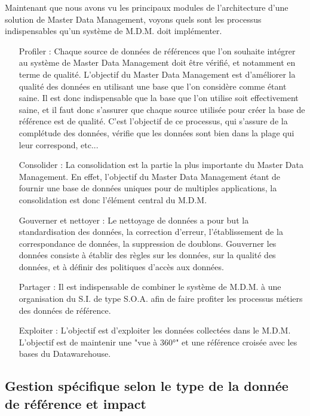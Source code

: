 Maintenant que nous avons vu les principaux modules de l'architecture d'une solution de Master Data Management, voyons quels sont les processus indispensables qu'un système de M.D.M. doit implémenter.

\begin{itemize}

\item[Profiler : ]
Chaque source de données de références que l'on souhaite intégrer au système de Master Data Management doit être vérifié, et notamment en terme de qualité. L'objectif du Master Data Management est d'améliorer la qualité des données en utilisant une base que l'on considère comme étant saine. Il est donc indispensable que la base que l'on utilise soit effectivement saine, et il faut donc s'assurer que chaque source utilisée pour créer la base de référence est de qualité. C'est l'objectif de ce processus, qui s'assure de la complétude des données, vérifie que les données sont bien dans la plage qui leur correspond, etc...

\item[Consolider : ]
La consolidation est la partie la plus importante du Master Data Management. En effet, l'objectif du Master Data Management étant de fournir une base de données uniques pour de multiples applications, la consolidation est donc l'élément central du M.D.M.

\item[Gouverner et nettoyer : ]
Le nettoyage de données a pour but la standardisation des données, la correction d'erreur, l'établissement de la correspondance de données, la suppression de doublons. Gouverner les données consiste à établir des règles sur les données, sur la qualité des données, et à définir des politiques d'accès aux données.

\item[Partager : ]
Il est indispensable de combiner le système de M.D.M. à une organisation du S.I. de type S.O.A. afin de faire profiter les processus métiers des données de référence.

\item[Exploiter : ]
L'objectif est d'exploiter les données collectées dans le M.D.M. L'objectif est de maintenir une "vue à 360°" et une référence croisée avec les bases du Datawarehouse.


\end{itemize}

\subsection{Gestion spécifique selon le type de la donnée de référence et impact}

